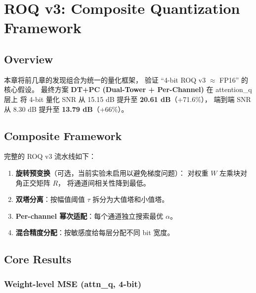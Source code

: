 
\section{ROQ v3: Composite Quantization Framework}

\subsection{Overview}

本章将前几章的发现组合为统一的量化框架，
验证 ``4-bit ROQ v3 $\approx$ FP16'' 的核心假设。
最终方案 \textbf{DT+PC (Dual-Tower + Per-Channel)} 在 attention\_q 层上
将 4-bit 量化 SNR 从 15.15 dB 提升至 \textbf{20.61 dB}（+71.6\%），
端到端 SNR 从 8.30 dB 提升至 \textbf{13.79 dB}（+66\%）。

\subsection{Composite Framework}

完整的 ROQ v3 流水线如下：

\begin{enumerate}
\item \textbf{旋转预变换}（可选，当前实验未启用以避免梯度问题）：
  对权重 $W$ 左乘块对角正交矩阵 $R$，
  将通道间相关性降到最低。
\item \textbf{双塔分离}：按幅值阈值 $\tau$ 拆分为大值塔和小值塔。
\item \textbf{Per-channel 幂次适配}：每个通道独立搜索最优 $\alpha$。
\item \textbf{混合精度分配}：按敏感度给每层分配不同 bit 宽度。
\end{enumerate}

\subsection{Core Results}

\subsubsection{Weight-level MSE (attn\_q, 4-bit)}

